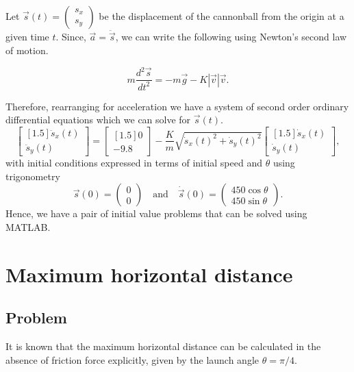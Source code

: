 \documentclass[11pt]{report}
\begin{document}
Let $\vec{s}(t)= \begin{pmatrix} s_x \\ s_y \end{pmatrix}$ be the displacement of the cannonball from the origin at a given time $t$. Since, $\vec{a}=\ddot{\vec{s}}$, we can write the following using Newton's second law of motion. 

\begin{equation}
	m\dfrac{d^2 \vec{s}}{dt^2} = -m\vec{g} - K|\vec{v}|\vec{v} \label{eq:n2l}.
\end{equation}

Therefore, rearranging for acceleration we have a system of second order ordinary differential equations which we can solve for $\vec{s}(t)$.
\begin{equation}
	\begin{bmatrix}[1.5]
	\ddot{s}_x(t) \\ \ddot{s}_y(t)
	\end{bmatrix}
	=
	\begin{bmatrix}[1.5]
	0 \\ -9.8
	\end{bmatrix}
	- \dfrac{K}{m}\sqrt{\dot{s}_x(t)^2 + \dot{s}_y(t)^2}
	\begin{bmatrix}[1.5]
	\dot{s}_x(t) \\ \dot{s}_y(t)
	\end{bmatrix},
	\label{eq:ode}
\end{equation}
with initial conditions expressed in terms of initial speed and $\theta$ using trigonometry
\begin{equation}
	\vec{s}(0) = \begin{pmatrix} 0 \\ 0 \end{pmatrix} \quad\text{and}\quad \dot{\vec{s}}(0) = \begin{pmatrix} 450\cos{\theta} \\ 450\sin{\theta} \end{pmatrix}.
	\label{eq:ic}
\end{equation}
Hence, we have a pair of initial value problems that can be solved using MATLAB.

\chapter{Maximum horizontal distance}
\section*{Problem}
It is known that the maximum horizontal distance can be calculated in the absence of friction force explicitly, given by the launch angle $\theta=\pi/4$.\\
\end{document}
